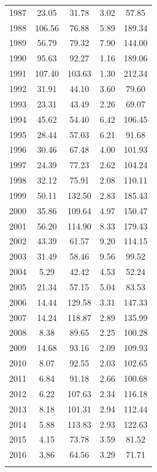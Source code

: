 \documentclass[12pt,]{article}
\begin{document}
\begin{longtable}{ccccc}
  1987 & 23.05 & 31.78 & 3.02 & 57.85 \\ 
  1988 & 106.56 & 76.88 & 5.89 & 189.34 \\ 
  1989 & 56.79 & 79.32 & 7.90 & 144.00 \\ 
  1990 & 95.63 & 92.27 & 1.16 & 189.06 \\ 
  1991 & 107.40 & 103.63 & 1.30 & 212.34 \\ 
  1992 & 31.91 & 44.10 & 3.60 & 79.60 \\ 
  1993 & 23.31 & 43.49 & 2.26 & 69.07 \\ 
  1994 & 45.62 & 54.40 & 6.42 & 106.45 \\ 
  1995 & 28.44 & 57.03 & 6.21 & 91.68 \\ 
  1996 & 30.46 & 67.48 & 4.00 & 101.93 \\ 
  1997 & 24.39 & 77.23 & 2.62 & 104.24 \\ 
  1998 & 32.12 & 75.91 & 2.08 & 110.11 \\ 
  1999 & 50.11 & 132.50 & 2.83 & 185.43 \\ 
  2000 & 35.86 & 109.64 & 4.97 & 150.47 \\ 
  2001 & 56.20 & 114.90 & 8.33 & 179.43 \\ 
  2002 & 43.39 & 61.57 & 9.20 & 114.15 \\ 
  2003 & 31.49 & 58.46 & 9.56 & 99.52 \\ 
  2004 & 5.29 & 42.42 & 4.53 & 52.24 \\ 
  2005 & 21.34 & 57.15 & 5.04 & 83.53 \\ 
  2006 & 14.44 & 129.58 & 3.31 & 147.33 \\ 
  2007 & 14.24 & 118.87 & 2.89 & 135.99 \\ 
  2008 & 8.38 & 89.65 & 2.25 & 100.28 \\ 
  2009 & 14.68 & 93.16 & 2.09 & 109.93 \\ 
  2010 & 8.07 & 92.55 & 2.03 & 102.65 \\ 
  2011 & 6.84 & 91.18 & 2.66 & 100.68 \\ 
  2012 & 6.22 & 107.63 & 2.34 & 116.18 \\ 
  2013 & 8.18 & 101.31 & 2.94 & 112.44 \\ 
  2014 & 5.88 & 113.83 & 2.93 & 122.63 \\ 
  2015 & 4.15 & 73.78 & 3.59 & 81.52 \\ 
  2016 & 3.86 & 64.56 & 3.29 & 71.71 \\ 
   \hline
\hline
\label{tab:Rec_removal}
\end{longtable}
\end{document}

